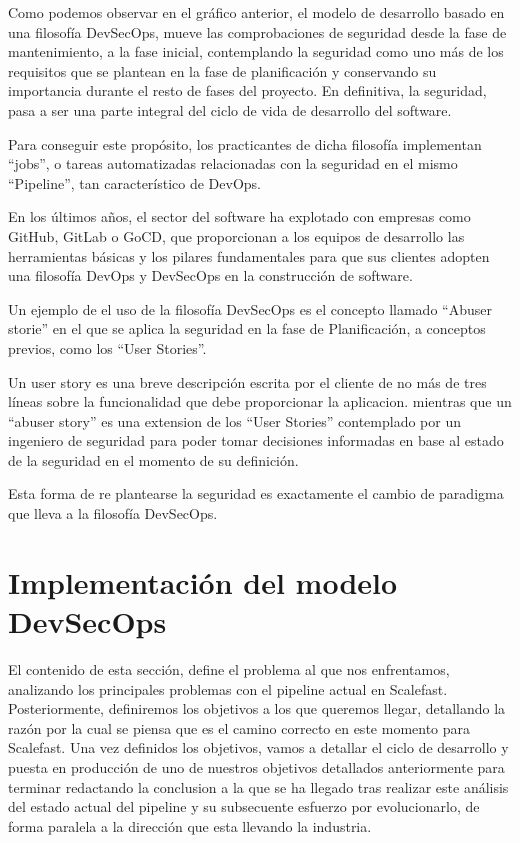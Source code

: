 \documentclass[12pt]{report} %
\begin{document}
Como podemos observar en el gráfico anterior, el modelo de desarrollo basado en una filosofía DevSecOps, mueve las comprobaciones de seguridad desde la fase de mantenimiento, a la fase inicial, contemplando la seguridad como uno más de los requisitos que se plantean en la fase de planificación y conservando su importancia durante el resto de fases del proyecto.
En definitiva, la seguridad, pasa a ser una parte integral del ciclo de vida de desarrollo del software. 

Para conseguir este propósito, los practicantes de dicha filosofía implementan ``jobs'', o tareas automatizadas relacionadas con la seguridad en el mismo ``Pipeline'', tan característico de DevOps.

En los últimos años, el sector del software ha explotado con empresas como GitHub, GitLab o GoCD, que proporcionan a los equipos de desarrollo las herramientas básicas y los pilares fundamentales para que sus clientes adopten una filosofía DevOps y DevSecOps en la construcción de software.\cite{Google2019}

Un ejemplo de el uso de la filosofía DevSecOps es el concepto llamado ``Abuser storie'' \cite{Bor2006} en el que se aplica la seguridad en la fase de Planificación, a conceptos previos, como los ``User Stories''.

Un user story es una breve descripción escrita por el cliente de no más de tres líneas sobre la funcionalidad que debe proporcionar la aplicacion.  \cite{XPUserStory} mientras que un ``abuser story'' es una extension de los ``User Stories'' contemplado por un ingeniero de seguridad para poder tomar decisiones informadas en base al estado de la seguridad en el momento de su definición. \cite{Bor2006}

Esta forma de re plantearse la seguridad es exactamente el cambio de paradigma que lleva a la filosofía DevSecOps.


\chapter{Implementación del modelo DevSecOps}

El contenido de esta sección, define el problema al que nos enfrentamos, analizando los principales problemas con el \gls{pipeline} actual en Scalefast.
Posteriormente, definiremos los objetivos a los que queremos llegar, detallando la razón por la cual se piensa que es el camino correcto en este momento para Scalefast.
Una vez definidos los objetivos, vamos a detallar el ciclo de desarrollo y puesta en producción de uno de nuestros objetivos detallados anteriormente para terminar redactando la conclusion a la que se ha llegado tras realizar este análisis del estado actual del \gls{pipeline} y su subsecuente esfuerzo por evolucionarlo, de forma paralela a la dirección que esta llevando la industria.
\end{document}
